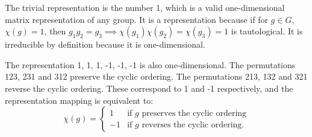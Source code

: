 \documentclass[12pt]{extarticle}
\begin{document}
The trivial representation is the number 1, which is a valid one-dimensional matrix representation of any group.
It is a representation because if for $g\in G$, $\chi(g) = 1$, then $g_1g_2 = g_3 \implies \chi(g_1)\chi(g_2) = \chi(g_3) = 1$ is tautological.
It is irreducible by definition because it is one-dimensional.

The representation 1, 1, 1, -1, -1, -1 is also one-dimensional.
The permutations 123, 231 and 312 preserve the cyclic ordering. The permutations 213, 132 and 321 reverse the cyclic ordering.
These correspond to 1 and -1 respectively, and the representation mapping is equivalent to:
\[
\chi(g) = \begin{cases}
1 & \text{if $g$ preserves the cyclic ordering} \\
-1 & \text{if $g$ reverses the cyclic ordering}.
\end{cases}
\]
\end{document}
